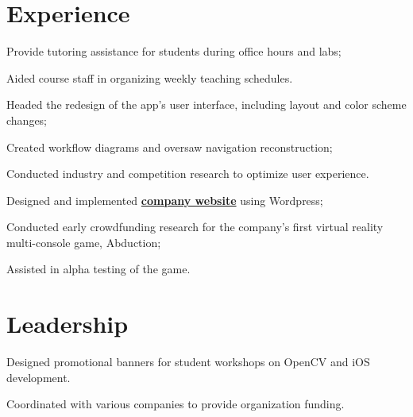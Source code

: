\documentclass[]{deedy-resume-openfont}
\begin{document}
\begin{minipage}[t]{0.66\textwidth} 


\section{Experience}

\vspace{\topsep} %
\begin{tightemize}\item Provide tutoring assistance for students during office hours and labs;
\item Aided course staff in organizing weekly teaching schedules.
\end{tightemize}
\sectionsep

\begin{tightemize}
\item Headed the redesign of the app’s user interface, including layout and color scheme
changes; \item Created workflow diagrams and oversaw navigation reconstruction; \item Conducted industry and competition research to optimize user experience. \end{tightemize}
\sectionsep

\begin{tightemize}
\item Designed and implemented \textbf{\href{http://redironlabs.ca}{company website}} using Wordpress;
\item Conducted early crowdfunding research for the company's first virtual reality multi-console game, Abduction;\item Assisted in alpha testing of the game.\end{tightemize}
\sectionsep


\section{Leadership}
\begin{tightemize}
\item Designed promotional banners for student workshops on OpenCV and iOS development.\item Coordinated with various companies to provide organization funding.
\end{tightemize}
\sectionsep


\end{minipage}
\end{document}
